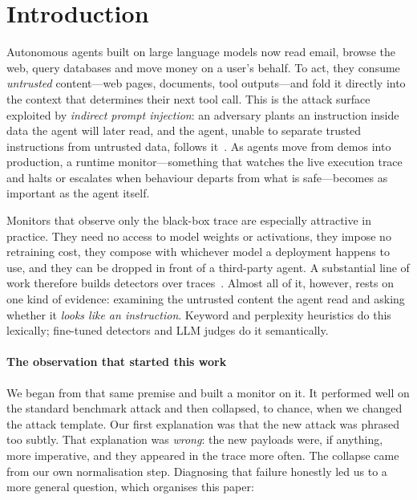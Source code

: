 \documentclass[preprint,12pt,number]{elsarticle}
\theoremstyle{definition}
\begin{document}
\section{Introduction}\label{sec:intro}

Autonomous agents built on large language models now read email, browse the web,
query databases and move money on a user's behalf. To act, they consume
\emph{untrusted} content---web pages, documents, tool outputs---and fold it
directly into the context that determines their next tool call. This is the
attack surface exploited by \emph{indirect prompt injection}: an adversary plants
an instruction inside data the agent will later read, and the agent, unable to
separate trusted instructions from untrusted data, follows
it~\citep{zhan2024injecagent,debenedetti2024agentdojo}. As agents move from demos
into production, a runtime monitor---something that watches the live execution
trace and halts or escalates when behaviour departs from what is safe---becomes
as important as the agent itself.

Monitors that observe only the black-box trace are especially attractive in
practice. They need no access to model weights or activations, they impose no
retraining cost, they compose with whichever model a deployment happens to use,
and they can be dropped in front of a third-party agent. A substantial line of
work therefore builds detectors over traces~\citep{wang2025agentarmor,
liu2025datasentinel,jia2024taskshield}. Almost all of it, however, rests on one
kind of evidence: examining the untrusted content the agent read and asking
whether it \emph{looks like an instruction}. Keyword and perplexity heuristics do
this lexically; fine-tuned detectors and LLM judges do it semantically.

\paragraph{The observation that started this work} We began from that same
premise and built a monitor on it. It performed well on the standard benchmark
attack and then collapsed, to chance, when we changed the attack template. Our
first explanation was that the new attack was phrased too subtly. That
explanation was \emph{wrong}: the new payloads were, if anything, more
imperative, and they appeared in the trace more often. The collapse came from our
own normalisation step. Diagnosing that failure honestly led us to a more
general question, which organises this paper:
\end{document}
